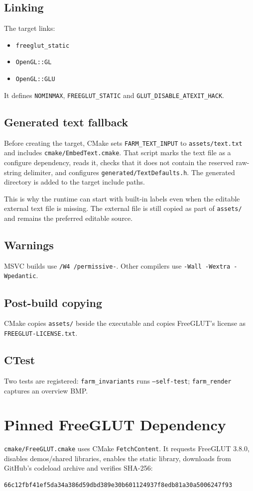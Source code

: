\documentclass[11pt,a4paper,openany]{book}
\newcommand{\code}[1]{\texttt{#1}}
\newcommand{\file}[1]{\nolinkurl{#1}}
\begin{document}
\section{Linking}
The target links:
\begin{itemize}
	\item \code{freeglut\_static}
	\item \code{OpenGL::GL}
	\item \code{OpenGL::GLU}
\end{itemize}
It defines \code{NOMINMAX}, \code{FREEGLUT_STATIC} and \code{GLUT_DISABLE_ATEXIT_HACK}.

\section{Generated text fallback}
Before creating the target, CMake sets \code{FARM_TEXT_INPUT} to \file{assets/text.txt} and includes \file{cmake/EmbedText.cmake}. That script marks the text file as a configure dependency, reads it, checks that it does not contain the reserved raw-string delimiter, and configures \file{generated/TextDefaults.h}. The generated directory is added to the target include paths.

This is why the runtime can start with built-in labels even when the editable external text file is missing. The external file is still copied as part of \file{assets/} and remains the preferred editable source.

\section{Warnings}
MSVC builds use \code{/W4 /permissive-}. Other compilers use \code{-Wall -Wextra -Wpedantic}.

\section{Post-build copying}
CMake copies \file{assets/} beside the executable and copies FreeGLUT's license as \file{FREEGLUT-LICENSE.txt}.

\section{CTest}
Two tests are registered: \code{farm\_invariants} runs \code{--self-test}; \code{farm\_render} captures an overview BMP.

\chapter{Pinned FreeGLUT Dependency}
\file{cmake/FreeGLUT.cmake} uses CMake \code{FetchContent}. It requests FreeGLUT 3.8.0, disables demos/shared libraries, enables the static library, downloads from GitHub's codeload archive and verifies SHA-256:
\begin{lstlisting}
66c12fbf41ef5da34a386d59dbd389e30b601124937f8edb81a30a5006247f93
\end{lstlisting}
\end{document}
